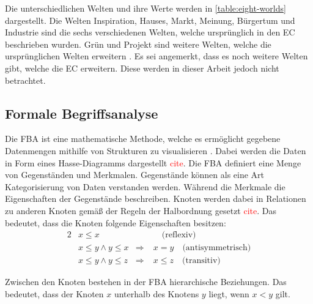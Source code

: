 Die unterschiedlichen Welten und ihre Werte werden in \autoref{table:eight-worlds} dargestellt.
Die Welten Inspiration, Hauses, Markt, Meinung, Bürgertum und Industrie sind die sechs verschiedenen Welten, welche ursprünglich in den \ac{EC} beschrieben wurden.
Grün und Projekt sind weitere Welten, welche die ursprünglichen Welten erweitern \cite{ec-green, new-spirit-of-capitalism}.
Es sei angemerkt, dass es noch weitere Welten gibt, welche die \ac{EC} erweitern.
Diese werden in dieser Arbeit jedoch nicht betrachtet.

\subsection{Formale Begriffsanalyse}
Die \ac{FBA} ist eine mathematische Methode, welche es ermöglicht gegebene Datenmengen mithilfe von Strukturen zu visualisieren \cite{formale-begriffsanalyse}.
Dabei werden die Daten in Form eines Hasse-Diagramms dargestellt \textcolor{red}{cite}.
Die \ac{FBA} definiert eine Menge von Gegenständen und Merkmalen.
Gegenstände können als eine Art Kategorisierung von Daten verstanden werden.
Während die Merkmale die Eigenschaften der Gegenstände beschreiben.
Knoten werden dabei in Relationen zu anderen Knoten gemäß der Regeln der Halbordnung gesetzt \textcolor{red}{cite}.
Das bedeutet, dass die Knoten folgende Eigenschaften besitzen:
\begin{alignat*}{2}
     & x\leq x              &                & \quad\text{(reflexiv)}            \\
     & x\leq y\land y\leq x & \Rightarrow \; & x=y \quad\text{(antisymmetrisch)} \\
     & x\leq y\land y\leq z & \Rightarrow \; & x\leq z \quad\text{(transitiv)}
\end{alignat*}

Zwischen den Knoten bestehen in der \ac{FBA} hierarchische Beziehungen.
Das bedeutet, dass der Knoten $x$ unterhalb des Knotens $y$ liegt, wenn $x < y$ gilt. %

